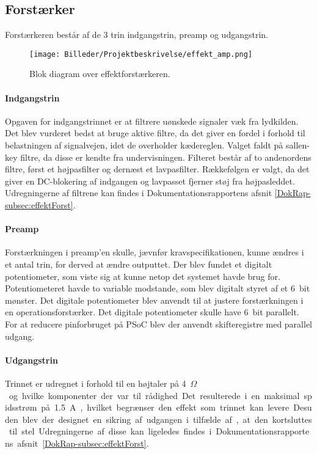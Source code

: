 \newpage
\subsection{Forstærker}

Forstærkeren består af de 3 trin indgangstrin, preamp og udgangstrin.
\begin{figure}[H]
  \centering
    \texttt{[image: Billeder/Projektbeskrivelse/effekt\_amp.png]}
    \caption{Blok diagram over effektforstærkeren.}
    \label{fig:effekt_amp}
\end{figure}

\paragraph{Indgangstrin} Opgaven for indgangstrinnet er at filtrere uønskede signaler væk fra lydkilden. Det blev vurderet bedst at bruge aktive filtre, da det giver en fordel i forhold til belastningen af signalvejen, idet de overholder kædereglen. Valget faldt på sallen-key filtre, da disse er kendte fra undervisningen. Filteret består af to andenordens filtre, først et højpasfilter og dernæst et lavpasfilter. Rækkefølgen er valgt, da det giver en DC-blokering af indgangen og lavpasset fjerner støj fra højpasleddet.
Udregningerne af filtrene kan findes i Dokumentationsrapportens afsnit \vref{DokRap-subsec:effektForst}.

\paragraph{Preamp} Forstærkningen i preamp'en skulle, jævnfør kravspecifikationen, kunne ændres i et antal trin, for derved at ændre outputtet. Der blev fundet et digitalt potentiometer, som viste sig at kunne netop det systemet havde brug for. Potentiometeret havde to variable modstande, som blev digitalt styret af et \SI{6}{bit} mønster. Det digitale potentiometer blev anvendt til at justere forstærkningen i en operationsforstærker. Det digitale potentiometer skulle have \SI{6}{bit} parallelt. For at reducere pinforbruget på PSoC blev der anvendt skifteregistre med parallel udgang.

\paragraph{Udgangstrin} Trinnet er udregnet i forhold til en højtaler på \SI{4}{$\Omega$} og hvilke komponenter der var til rådighed. Det resulterede i en maksimal spidsstrøm på \SI{1,5}{A}, hvilket begrænser den effekt som trinnet kan levere. Desuden blev der designet en sikring af udgangen i tilfælde af, at den kortsluttes til stel.
Udregningerne af disse kan ligeledes findes i Dokumentationsrapportens afsnit \vref{DokRap-subsec:effektForst}.